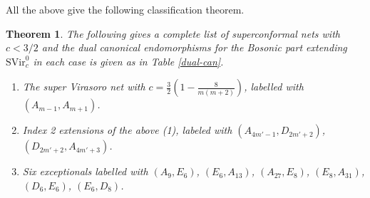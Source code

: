 \documentclass[11pt]{article}
\newtheorem{theorem}{Theorem}
\def\A{{\cal A}}
\def\B{{\cal B}}
\def\I{{\cal I}}
\def\Sn{S^{1(n)}}
\def\SVir{{\mathrm {SVir}}}
\def\A{{\mathcal A}}
\def\B{{\mathcal B}}
\def\I{{\mathcal I}}
\begin{document}
All the above give the following classification theorem.
%
\begin{theorem}\label{main}
The following gives a complete list of superconformal nets with
$c<3/2$ and the dual canonical endomorphisms for the Bosonic
part extending $\SVir^0_c$ in each case is given as in
Table \ref{dual-can}.
\begin{enumerate}
\item The super Virasoro net with
$c=\displaystyle\frac{3}{2}\left(1-\frac{8}{m(m+2)}\right)$,
labelled with $(A_{m-1}, A_{m+1})$.
\item Index 2 extensions of the above (1), labeled with
$(A_{4m'-1}, D_{2m'+2})$, $(D_{2m'+2}, A_{4m'+3})$.
\item Six exceptionals labelled with
$(A_9, E_6)$, $(E_6, A_{13})$, $(A_{27}, E_8)$, $(E_8, A_{31})$,
$(D_6, E_6)$, $(E_6, D_8)$.
\end{enumerate}
\end{theorem}
%

\end{document}
